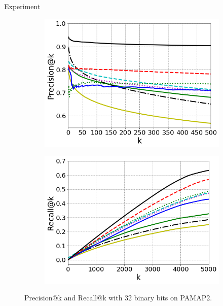 \documentclass[final]{beamer}
\newlength{\onecolwid}
\begin{document}
\begin{frame}[t]
\begin{columns}[t]
\begin{column}{\onecolwid}
\begin{block}{Experiment}
 \begin{figure}\vspace{2mm}
     \begin{subfigure}[t]{0.45\textwidth}
            \includegraphics[width=\textwidth]{fig4b}
            \label{fig:a}
     \end{subfigure}
     \quad
     \begin{subfigure}[t]{0.45\textwidth}
            \includegraphics[width=\textwidth]{fig5b}
            \label{fig:b}
     \end{subfigure}
      \caption{Precision@k and Recall@k with 32 binary bits on PAMAP2.}\vspace{-5mm}
 \end{figure}

\end{block}
\end{column}
\end{columns}
\end{frame}
\end{document}
